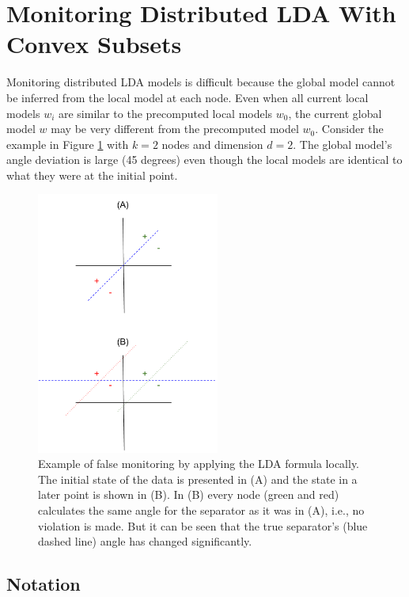 \documentclass[11pt,twocolumn,varwidth=true,a4paper,fleqn]{article}
\begin{document}
\section{Monitoring Distributed LDA With Convex Subsets}
Monitoring distributed LDA models is difficult because the
global model cannot be inferred from the local model at each
node. Even when all current local models $w_i$ are similar to the precomputed
local models $w_0$, the current global model $w$ may
be very different from the precomputed model $w_0$. Consider
the example in Figure \ref{NegativeExampl} with $k = 2$ nodes and dimension $d =
2$. The global model's angle deviation is large (45 degrees) even
though the local models are identical to what they were at the initial
point.

\begin{figure}[h]
\centering
\includegraphics[width=60mm]{NegativeExample.png}
\caption{Example of false monitoring by applying the LDA formula locally. The
initial state of the data is presented in (A) and the state in a later point
is shown in (B). In (B) every node (green and red) calculates the same angle
for the separator as it was in (A), i.e., no violation is made. But it can be
seen that the true separator's (blue dashed line) angle has changed
significantly.}
\label{NegativeExampl}
\end{figure}
\subsection{Notation}
\end{document}
